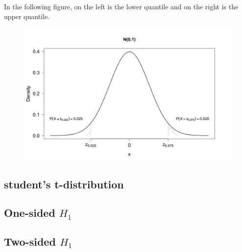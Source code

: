 In the following figure, on the left is the lower quantile and on the right is the upper quantile.

\begin{figure}[H]
	\centering
	\includegraphics[width=0.5\linewidth]{fig/norm-distribution}
	\caption{}
	\label{fig:norm-distribution}
\end{figure}
\subsection{student's t-distribution}
\subsection{One-sided $H_1$}
\subsection{Two-sided $H_1$}